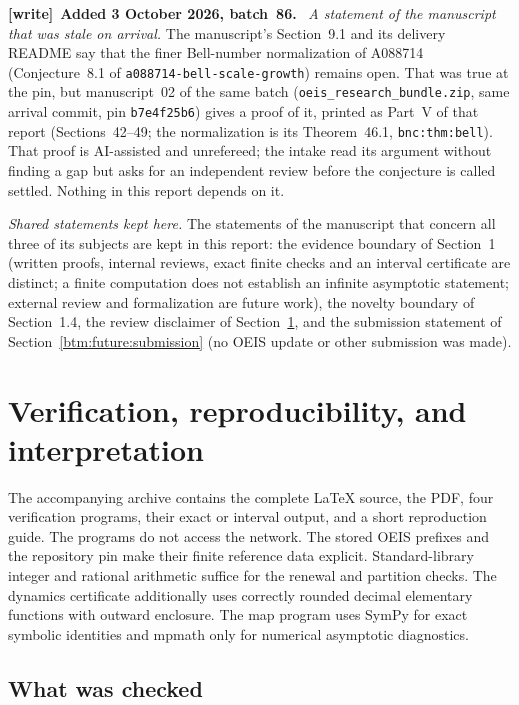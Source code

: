 \documentclass[11pt,letterpaper]{article}
\numberwithin{equation}{section}
\theoremstyle{definition}
\theoremstyle{remark}
\newenvironment{writenote}[1][]{\par\smallskip\begingroup\small
 \noindent\textbf{[write]}\if\relax\detokenize{#1}\relax\else~\textbf{#1.}\fi\ }%
 {\par\endgroup\smallskip}
\begin{document}
\begin{writenote}[Added 3 October 2026, batch~86]
\emph{A statement of the manuscript that was stale on arrival.} The
manuscript's Section~9.1 and its delivery README say that the finer
Bell-number normalization of A088714 (Conjecture~8.1 of
\texttt{a088714-\allowbreak bell-\allowbreak scale-\allowbreak growth}) remains open. That was true at the
pin, but manuscript~02 of the same batch (\texttt{oeis\_research\_bundle.zip},
same arrival commit, pin \texttt{b7e4f25b6}) gives a proof of it, printed as
Part~V of that report (Sections~42--49; the normalization is its
Theorem~46.1, \nolinkurl{bnc:thm:bell}). That proof is AI-assisted and
unrefereed; the intake read its argument without finding a gap but asks for
an independent review before the conjecture is called settled. Nothing in
this report depends on it.

\emph{Shared statements kept here.} The statements of the manuscript that
concern all three of its subjects are kept in this report: the evidence
boundary of Section~1 (written proofs, internal reviews, exact finite checks
and an interval certificate are distinct; a finite computation does not
establish an infinite asymptotic statement; external review and
formalization are future work), the novelty boundary of Section~1.4, the
review disclaimer of Section~\ref{btm:verify:section}, and the submission
statement of Section~\ref{btm:future:submission} (no OEIS update or other
submission was made).
\end{writenote}

\section{Verification, reproducibility, and interpretation}
\label{btm:verify:section}

The accompanying archive contains the complete \LaTeX{} source, the PDF,
four verification programs, their exact or interval output, and a short
reproduction guide. The programs do not access the network. The stored
OEIS prefixes and the repository pin make their finite reference data
explicit. Standard-library integer and rational arithmetic suffice for
the renewal and partition checks. The dynamics certificate additionally
uses correctly rounded decimal elementary functions with outward
enclosure. The map program uses SymPy for exact symbolic identities and
mpmath only for numerical asymptotic diagnostics.

\subsection{What was checked}
\end{document}
